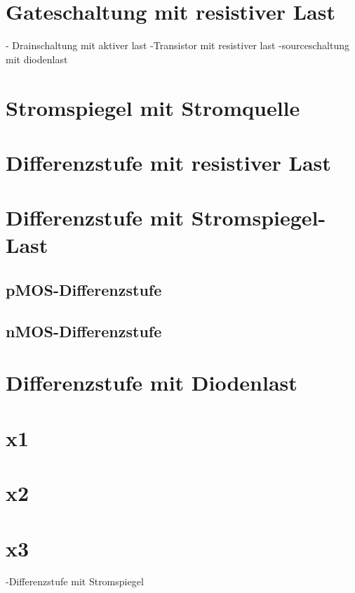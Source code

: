 \documentclass[european]{latex4ei_sheet}
\begin{document}
\section{Gateschaltung mit resistiver Last}
- Drainschaltung mit aktiver last
-Transistor mit resistiver last
-sourceschaltung mit diodenlast

\section{Stromspiegel mit Stromquelle}

\section{Differenzstufe mit resistiver Last}

\section{Differenzstufe mit Stromspiegel-Last}
	\subsection{pMOS-Differenzstufe}
	
	\subsection{nMOS-Differenzstufe}

\section{Differenzstufe mit Diodenlast}

\section{x1}

\section{x2}

\section{x3}

-Differenzstufe mit Stromspiegel





\end{document}
